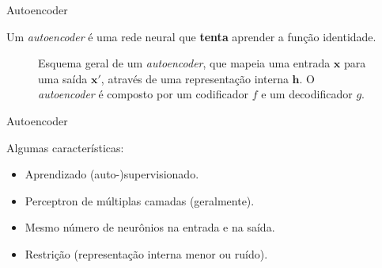 \documentclass{beamer}
\begin{document}
\begin{frame}{Autoencoder}

	\justifying

	Um \emph{autoencoder} é uma rede neural que \textbf{tenta} aprender a função identidade.

	\begin{figure}

		\centering


		\caption{
			\justifying
			Esquema geral de um \emph{autoencoder}, que mapeia uma entrada $\boldsymbol{x}$ para uma saída $\boldsymbol{x'}$, através de uma representação interna $\boldsymbol{h}$.
			O \emph{autoencoder} é composto por um codificador $f$ e um decodificador $g$.
		}

	\end{figure}

\end{frame}

\begin{frame}{Autoencoder}

	Algumas características:

	\begin{itemize}
		\item<2-> Aprendizado (auto-)supervisionado.
		\item<3-> Perceptron de múltiplas camadas (geralmente).
		\item<4-> Mesmo número de neurônios na entrada e na saída.
		\item<5-> Restrição (representação interna menor ou ruído).
	\end{itemize}

\end{frame}
\end{document}
